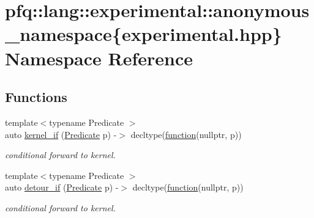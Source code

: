 \hypertarget{namespacepfq_1_1lang_1_1experimental_1_1anonymous__namespace_02experimental_8hpp_03}{}\section{pfq\+:\+:lang\+:\+:experimental\+:\+:anonymous\+\_\+namespace\{experimental.\+hpp\} Namespace Reference}
\label{namespacepfq_1_1lang_1_1experimental_1_1anonymous__namespace_02experimental_8hpp_03}
\subsection*{Functions}
\begin{DoxyCompactItemize}
\item 
{\footnotesize template$<$typename Predicate $>$ }\\auto \hyperlink{namespacepfq_1_1lang_1_1experimental_1_1anonymous__namespace_02experimental_8hpp_03_a805cf466389c487e6b2db6126a42d675}{kernel\+\_\+if} (\hyperlink{structpfq_1_1lang_1_1Predicate}{Predicate} p) -\/$>$ decltype(\hyperlink{namespacepfq_1_1lang_a1a4638059d700ae08d0ca63886ff2bb3}{function}(nullptr, p))
\begin{DoxyCompactList}\small\item\em conditional forward to kernel. \end{DoxyCompactList}\item 
{\footnotesize template$<$typename Predicate $>$ }\\auto \hyperlink{namespacepfq_1_1lang_1_1experimental_1_1anonymous__namespace_02experimental_8hpp_03_a93e32ea5a9dd3c95f4811c4ad24e7ba0}{detour\+\_\+if} (\hyperlink{structpfq_1_1lang_1_1Predicate}{Predicate} p) -\/$>$ decltype(\hyperlink{namespacepfq_1_1lang_a1a4638059d700ae08d0ca63886ff2bb3}{function}(nullptr, p))
\begin{DoxyCompactList}\small\item\em conditional forward to kernel. \end{DoxyCompactList}\end{DoxyCompactItemize}

